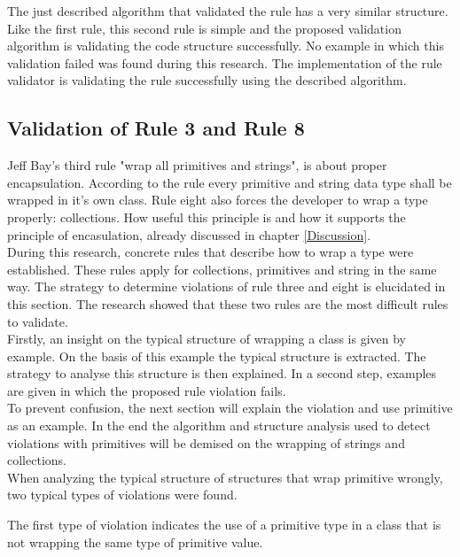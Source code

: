 The just described algorithm that validated the rule has a very similar structure. Like the first rule, this second rule is simple and the proposed validation algorithm is validating the code structure successfully. No example in which this validation failed was found during this research. The implementation of the rule validator is validating the rule successfully using the described algorithm.

\subsection*{Validation of Rule 3 and Rule 8}
Jeff Bay's third rule "wrap all primitives and strings", is about proper encapsulation. According to the rule every primitive and string data type shall be wrapped in it's own class. Rule eight also forces the developer to wrap a type properly: collections. How useful this principle is and how it supports the principle of encasulation, already discussed in chapter \ref{Discussion}.
\\

During this research, concrete rules that describe how to wrap a type were established. These rules apply for collections, primitives and string in the same way. The strategy to determine violations of rule three and eight is elucidated in this section. The research showed that these two rules are the most difficult rules to validate.
\\

Firstly, an insight on the typical structure of wrapping a class is given by example. On the basis of this example the typical structure is extracted. The strategy to analyse this structure is then explained. In a second step, examples are given in which the proposed rule violation fails. 
\\

To prevent confusion, the next section will explain the violation and use primitive as an example. In the end the algorithm and structure analysis used to detect violations with primitives will be demised on the wrapping of strings and collections.
\\

When analyzing the typical structure of structures that wrap primitive wrongly, two typical types of violations were found. 

The first type of violation indicates the use of a primitive type in a class that is not wrapping the same type of primitive value. 

